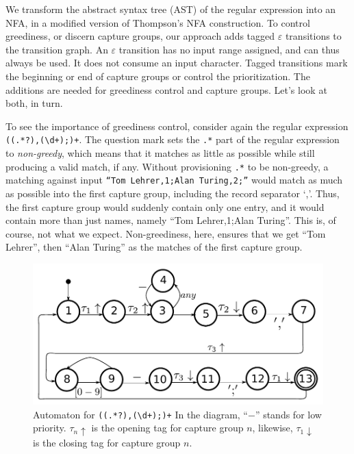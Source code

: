 \documentclass[11pt,a4paper,twoside,openright]{Thesis}
\theoremstyle{definition}
\begin{document}
We transform the abstract syntax tree (AST) of the regular expression into an NFA,
in a modified version of Thompson's NFA construction. To
control greediness, or discern capture groups, our approach adds tagged
$\varepsilon$ transitions to the transition graph. An
$\varepsilon$ transition has no input range assigned, and can thus always
be used. It does not consume an input character. Tagged transitions 
mark the beginning or end of capture groups or control the prioritization.
The additions are needed for greediness control and capture groups.
Let's look at both, in turn.

To see the importance of greediness control, consider again the regular
expression \texttt{((.*?),(\textbackslash{}d+);)+}. The question
mark sets the \texttt{.*} part of the regular expression to
\emph{non-greedy}, which means that it matches as little as
possible while still producing a valid match, if any.  Without
provisioning \texttt{.*} to be non-greedy, a matching against input
\texttt{``Tom Lehrer,1;Alan Turing,2;''} would match as much as
possible into the first capture group, including the record separator
`,'.  Thus, the first capture group would suddenly contain only one
entry, and it would contain more than just names, namely ``Tom
Lehrer,1;Alan Turing''.  This is, of course, not what we expect.
Non-greediness, here, ensures that we get ``Tom Lehrer'', then
``Alan Turing'' as the matches of the first capture group.

\begin{figure}[htp]
\includegraphics[width=\linewidth]{graphs/lehrer_automaton}

\caption[NFA for \texttt{((.*?),(\textbackslash{}d+);)+}]{\label{fig:example-automaton}
Automaton for \texttt{((.*?),(\textbackslash{}d+);)+} 
In the diagram, ``$-$'' stands for low priority. $\tau_n\uparrow$ is the
opening tag for capture group $n$, likewise, $\tau_1\downarrow$ is the closing
tag for capture group $n$.}
\end{figure}
\end{document}
